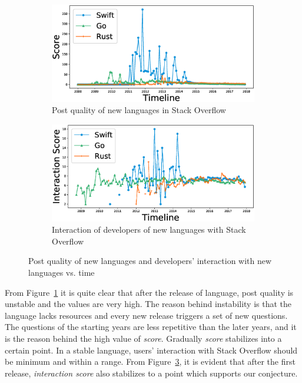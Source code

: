 \begin{figure}[htbp]
\begin{subfigure}{0.6\textwidth}
\centering
\includegraphics[scale=0.2]{figures/content_quality.eps}
\caption{Post quality of new languages in Stack Overflow}
\label{fig:Content quality}
\end{subfigure}
\begin{subfigure}{0.6\textwidth}
\centering
\includegraphics[scale=0.2]{figures/interaction.eps}
\caption{Interaction of developers of new languages with Stack Overflow}
\label{fig:Interaction}
\end{subfigure}
\caption{Post quality of new languages and developers' interaction with new languages vs. time }
\end{figure}

From Figure~\ref{fig:Content quality} it is quite clear that after the release of language, post quality is unstable and the values are very high. The reason behind instability is that the language lacks resources and every new release triggers a set of new questions. The questions of the starting years are less repetitive than the later years\citep{Srba2016}, and it is the reason behind the high value of \emph{score}. Gradually \emph{score} stabilizes into a certain point. In a stable language, users' interaction with Stack Overflow should be minimum and within a range. From Figure~\ref{fig:Interaction}, it is evident that after the first release, \emph{interaction score} also stabilizes to a point which supports our conjecture.

